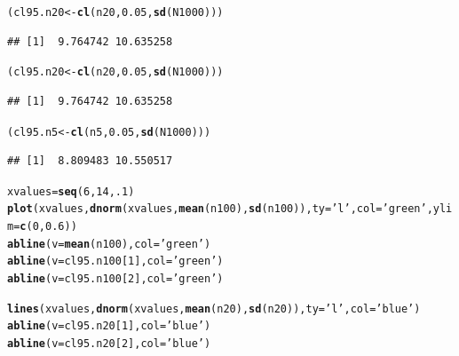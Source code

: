 \documentclass{tufte-handout}\usepackage[]{graphicx}\usepackage[]{color}
\makeatletter
\newcommand{\hlnum}[1]{\textcolor[rgb]{0.686,0.059,0.569}{#1}}%
\newcommand{\hlstr}[1]{\textcolor[rgb]{0.192,0.494,0.8}{#1}}%
\newcommand{\hlstd}[1]{\textcolor[rgb]{0.345,0.345,0.345}{#1}}%
\newcommand{\hlkwb}[1]{\textcolor[rgb]{0.69,0.353,0.396}{#1}}%
\newcommand{\hlkwc}[1]{\textcolor[rgb]{0.333,0.667,0.333}{#1}}%
\newcommand{\hlkwd}[1]{\textcolor[rgb]{0.737,0.353,0.396}{\textbf{#1}}}%
\newenvironment{kframe}{%
 \def\at@end@of@kframe{}%
 \ifinner\ifhmode%
  \def\at@end@of@kframe{\end{minipage}}%
  \begin{minipage}{\columnwidth}%
 \fi\fi%
 \def\FrameCommand##1{\hskip\@totalleftmargin \hskip-\fboxsep
 \colorbox{shadecolor}{##1}\hskip-\fboxsep
     \hskip-\linewidth \hskip-\@totalleftmargin \hskip\columnwidth}%
 \MakeFramed {\advance\hsize-\width
   \@totalleftmargin\z@ \linewidth\hsize
   \@setminipage}}%
 {\par\unskip\endMakeFramed%
 \at@end@of@kframe}
\newenvironment{knitrout}{}{} %
\makeatother
\begin{document}
\begin{knitrout}
\color{fgcolor}\begin{kframe}
\begin{alltt}
\hlstd{(cl95.n20} \hlkwb{<-} \hlkwd{cl}\hlstd{(n20,} \hlnum{0.05}\hlstd{,} \hlkwd{sd}\hlstd{(N1000)))}
\end{alltt}
\begin{verbatim}
## [1]  9.764742 10.635258
\end{verbatim}
\begin{alltt}
\hlstd{(cl95.n20} \hlkwb{<-} \hlkwd{cl}\hlstd{(n20,} \hlnum{0.05}\hlstd{,} \hlkwd{sd}\hlstd{(N1000)))}
\end{alltt}
\begin{verbatim}
## [1]  9.764742 10.635258
\end{verbatim}
\begin{alltt}
\hlstd{(cl95.n5} \hlkwb{<-} \hlkwd{cl}\hlstd{(n5,} \hlnum{0.05}\hlstd{,} \hlkwd{sd}\hlstd{(N1000)))}
\end{alltt}
\begin{verbatim}
## [1]  8.809483 10.550517
\end{verbatim}
\begin{alltt}
\hlstd{xvalues} \hlkwb{=} \hlkwd{seq}\hlstd{(}\hlnum{6}\hlstd{,}\hlnum{14}\hlstd{,}\hlnum{.1}\hlstd{)}
\hlkwd{plot}\hlstd{(xvalues,} \hlkwd{dnorm}\hlstd{(xvalues,} \hlkwd{mean}\hlstd{(n100),} \hlkwd{sd}\hlstd{(n100)),} \hlkwc{ty}\hlstd{=}\hlstr{'l'}\hlstd{,} \hlkwc{col}\hlstd{=}\hlstr{'green'}\hlstd{,} \hlkwc{ylim}\hlstd{=}\hlkwd{c}\hlstd{(}\hlnum{0}\hlstd{,} \hlnum{0.6}\hlstd{))}
\hlkwd{abline}\hlstd{(}\hlkwc{v}\hlstd{=}\hlkwd{mean}\hlstd{(n100),} \hlkwc{col}\hlstd{=}\hlstr{'green'}\hlstd{)}
\hlkwd{abline}\hlstd{(}\hlkwc{v}\hlstd{=cl95.n100[}\hlnum{1}\hlstd{],} \hlkwc{col}\hlstd{=}\hlstr{'green'}\hlstd{)}
\hlkwd{abline}\hlstd{(}\hlkwc{v}\hlstd{=cl95.n100[}\hlnum{2}\hlstd{],} \hlkwc{col}\hlstd{=}\hlstr{'green'}\hlstd{)}

\hlkwd{lines}\hlstd{(xvalues,} \hlkwd{dnorm}\hlstd{(xvalues,} \hlkwd{mean}\hlstd{(n20),} \hlkwd{sd}\hlstd{(n20)),} \hlkwc{ty}\hlstd{=}\hlstr{'l'}\hlstd{,} \hlkwc{col}\hlstd{=}\hlstr{'blue'}\hlstd{)}
\hlkwd{abline}\hlstd{(}\hlkwc{v}\hlstd{=cl95.n20[}\hlnum{1}\hlstd{],} \hlkwc{col}\hlstd{=}\hlstr{'blue'}\hlstd{)}
\hlkwd{abline}\hlstd{(}\hlkwc{v}\hlstd{=cl95.n20[}\hlnum{2}\hlstd{],} \hlkwc{col}\hlstd{=}\hlstr{'blue'}\hlstd{)}


\end{alltt}
\end{kframe}
\end{knitrout}
\end{document}
